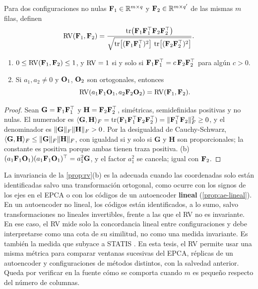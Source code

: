 \begin{definicion}[Coeficiente RV]\label{def:rv}
Para dos configuraciones no nulas $\mathbf{F}_1\in\mathbb{R}^{m\times q}$ y $\mathbf{F}_2\in\mathbb{R}^{m\times q'}$ de las
mismas $m$ filas,
\textcite{robert_escoufier_1976} definen
\begin{equation}\label{eq:rv}
  \operatorname{RV}(\mathbf{F}_1,\mathbf{F}_2)=\frac{\operatorname{tr}\bigl(\mathbf{F}_1\mathbf{F}_1^{\top}\mathbf{F}_2\mathbf{F}_2^{\top}\bigr)}
  {\sqrt{\operatorname{tr}\bigl[(\mathbf{F}_1\mathbf{F}_1^{\top})^2\bigr]\,\operatorname{tr}\bigl[(\mathbf{F}_2\mathbf{F}_2^{\top})^2\bigr]}} .
\end{equation}
\end{definicion}

\begin{proposicion}\label{prop:rv}
\begin{enumerate}[label=(\alph*)]
  \item $0\le\operatorname{RV}(\mathbf{F}_1,\mathbf{F}_2)\le1$, y $\operatorname{RV}=1$ si y solo si $\mathbf{F}_1\mathbf{F}_1^{\top}=c\,\mathbf{F}_2\mathbf{F}_2^{\top}$
    para algún $c>0$.
  \item Si $a_1,a_2\ne0$ y $\mathbf{O}_1$, $\mathbf{O}_2$ son ortogonales, entonces
    \[\operatorname{RV}(a_1\mathbf{F}_1\mathbf{O}_1,a_2\mathbf{F}_2\mathbf{O}_2)=\operatorname{RV}(\mathbf{F}_1,\mathbf{F}_2).\]
\end{enumerate}
\end{proposicion}

\begin{proof}
Sean $\mathbf{G}=\mathbf{F}_1\mathbf{F}_1^{\top}$ y $\mathbf{H}=\mathbf{F}_2\mathbf{F}_2^{\top}$, simétricas, semidefinidas
positivas y no nulas. El numerador es
$\langle \mathbf{G},\mathbf{H}\rangle_{F}=\operatorname{tr}(\mathbf{F}_1\mathbf{F}_1^{\top}\mathbf{F}_2\mathbf{F}_2^{\top})=\lVert \mathbf{F}_1^{\top}\mathbf{F}_2\rVert_{F}^2\ge0$, y
el denominador es $\lVert \mathbf{G}\rVert_{F}\lVert \mathbf{H}\rVert_{F}>0$. Por la desigualdad de Cauchy-Schwarz,
$\langle \mathbf{G},\mathbf{H}\rangle_{F}\le\lVert \mathbf{G}\rVert_{F}\lVert \mathbf{H}\rVert_{F}$, con igualdad si y solo si
$\mathbf{G}$ y $\mathbf{H}$ son proporcionales; la constante es positiva porque ambas tienen traza
positiva. (b) $(a_1\mathbf{F}_1\mathbf{O}_1)(a_1\mathbf{F}_1\mathbf{O}_1)^{\top}=a_1^2\mathbf{G}$, y el factor $a_1^2$ se cancela;
igual con $\mathbf{F}_2$.
\end{proof}

La invariancia de la \cref{prop:rv}(b) es la adecuada cuando las coordenadas solo están
identificadas salvo una transformación ortogonal, como ocurre con los signos de los ejes en el EPCA
o con los códigos de un autoencoder \textbf{lineal} (\cref{prop:ae-lineal}). En un autoencoder no
lineal, los códigos están identificados, a lo sumo, salvo transformaciones no lineales invertibles,
frente a las que el RV no es invariante. En ese caso, el RV mide solo la concordancia lineal entre
configuraciones y debe interpretarse como una cota de su similitud, no como una medida invariante.
Es también la medida que subyace a STATIS \parencite{lavit_1988}. En esta tesis, el RV permite usar una misma métrica para comparar ventanas sucesivas del
EPCA, réplicas de un autoencoder y configuraciones de métodos distintos, con la salvedad anterior.
Queda por verificar en la fuente cómo se comporta cuando $m$ es pequeño respecto del número de
columnas.

